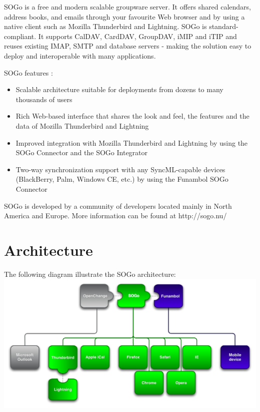 \documentclass[]{article}
\makeatletter
\def\maxwidth{\ifdim\Gin@nat@width>\linewidth\linewidth
\else\Gin@nat@width\fi}
\let\Oldincludegraphics\includegraphics
\renewcommand{\includegraphics}[1]{\Oldincludegraphics[width=\maxwidth]{#1}}
\makeatother
\begin{document}
SOGo is a free and modern scalable groupware server. It offers shared
calendars, address books, and emails through your favourite Web browser
and by using a native client such as Mozilla Thunderbird and Lightning.
SOGo is standard-compliant. It supports CalDAV, CardDAV, GroupDAV, iMIP
and iTIP and reuses existing IMAP, SMTP and database servers - making
the solution easy to deploy and interoperable with many applications.

SOGo features :

\begin{itemize}
\itemsep1pt\parskip0pt
\item
  Scalable architecture suitable for deployments from dozens to many
  thousands of users
\item
  Rich Web-based interface that shares the look and feel, the features
  and the data of Mozilla Thunderbird and Lightning
\item
  Improved integration with Mozilla Thunderbird and Lightning by using
  the SOGo Connector and the SOGo Integrator
\item
  Two-way synchronization support with any SyncML-capable devices
  (BlackBerry, Palm, Windows CE, etc.) by using the Funambol SOGo
  Connector
\end{itemize}

SOGo is developed by a community of developers located mainly in North
America and Europe. More information can be found at http://sogo.nu/

\section{Architecture}

The following diagram illustrate the SOGo architecture:\\
\includegraphics{architecture.png}
\end{document}
